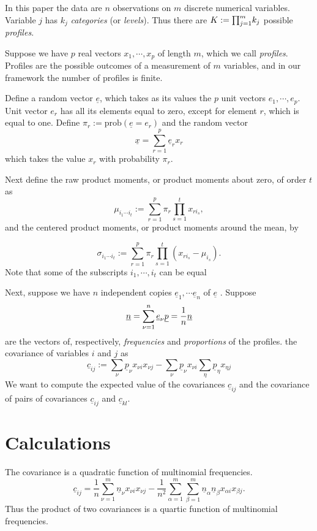 \documentclass[
  12pt,
  letterpaper,
  DIV=11,
  numbers=noendperiod]{scrartcl}
\newcommand{\sectionbreak}{\clearpage}
\newcommand{\ul}[1]{\underline{#1}}
\begin{document}
In this paper the data are \(n\) observations on \(m\) discrete
numerical variables. Variable \(j\) has \(k_j\) \emph{categories} (or
\emph{levels}). Thus there are \(K:=\smash{\prod_{j=1}^m}k_j\) possible
\emph{profiles}.

Suppose we have \(p\) real vectors \(x_1,\cdots,x_p\) of length \(m\),
which we call \emph{profiles}. Profiles are the possible outcomes of a
measurement of \(m\) variables, and in our framework the number of
profiles is finite.

Define a random vector \(\ul{e}\), which takes as its values the \(p\)
unit vectors \(e_1,\cdots,e_p\). Unit vector \(e_r\) has all its
elements equal to zero, except for element \(r\), which is equal to one.
Define \(\pi_r:=\text{prob}(\ul{e}=e_r)\) and the random vector \[
\ul{x}=\sum_{r=1}^p\ul{e}_rx_r
\] which takes the value \(x_r\) with probability \(\pi_r\).

Next define the raw product moments, or product moments about zero, of
order \(t\) as \[
\mu_{i_1\cdots i_t}:=\sum_{r=1}^p \pi_r\prod_{s=1}^tx_{ri_s},
\] and the centered product moments, or product moments around the mean,
by

\[
\sigma_{i_1\cdots i_t}:=\sum_{r=1}^p \pi_r\prod_{s=1}^t(x_{ri_s}-\mu_{i_s}).
\] Note that some of the subscripts \(i_1,\cdots,i_t\) can be equal

Next, suppose we have \(n\) independent copies
\(\ul{e}_1,\cdots\ul{e}_n\) of \(\ul{e}\) . Suppose \[
\ul{n}=\sum_{\nu=1}^n\ul{e}_\nu\\
\ul{p}=\frac{1}{n}\ul{n}
\] are the vectors of, respectively, \emph{frequencies} and
\emph{proportions} of the profiles. the covariance of variables \(i\)
and \(j\) as \[
\ul{c}_{ij}:=\sum_\nu \ul{p}_\nu x_{\nu i}x_{\nu j}-\sum_\nu \ul{p}_\nu x_{\nu i}\sum_\eta\ul{p}_\eta x_{\eta j}
\] We want to compute the expected value of the covariances
\(\ul{c}_{ij}\) and the covariance of pairs of covariances
\(\ul{c}_{ij}\) and \(\ul{c}_{kl}\).

\sectionbreak

\section{Calculations}\label{calculations}

The covariance is a quadratic function of multinomial frequencies.
\begin{equation}
\ul{c}_{ij}=\frac{1}{n}\sum_{\nu=1}^m\ul{n}_\nu x_{\nu i}x_{\nu j}-\frac{1}{n^2}\sum_{\alpha=1}^m\sum_{\beta=1}^m\ul{n}_\alpha\ul{n}_\beta x_{\alpha i}x_{\beta j}.\label{eq-covfreq}
\end{equation} Thus the product of two covariances is a quartic function
of multinomial frequencies.
\end{document}
